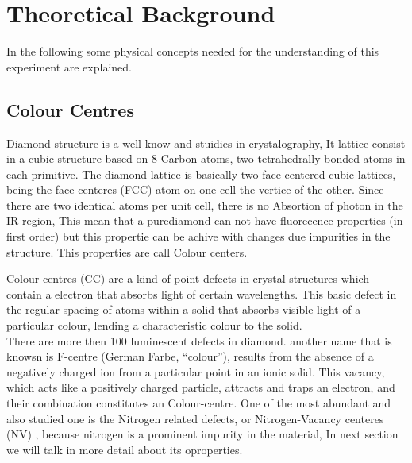 \section{Theoretical Background}
In the following some physical concepts needed for the understanding of this experiment are explained.
\subsection{Colour Centres}




Diamond structure is a well know and stuidies in crystalography, It lattice consist in a cubic structure based on 8 Carbon atoms, two tetrahedrally bonded atoms in each primitive. The diamond lattice is basically two face-centered cubic lattices, being the face centeres (FCC) atom on one cell the vertice of the other. Since there are two  identical atoms per unit cell, there is no Absortion of photon in the IR-region, This mean that a purediamond can not have fluorecence properties (in first order) but this propertie can be achive with changes due impurities in the structure. This properties are call Colour centers.

Colour centres (CC) are a kind of point defects in crystal structures which contain a electron that absorbs light of certain wavelengths. This basic defect in the regular spacing of atoms within a solid that absorbs visible light of a particular colour, lending a characteristic colour to the solid. \\

There are more then 100 luminescent defects in diamond. another name that is knowsn is F-centre (German Farbe, “colour”), results from the absence of a negatively charged ion from a particular point in an ionic solid. This vacancy, which acts like a positively charged particle, attracts and traps an electron, and their combination constitutes an Colour-centre.  One of the most abundant and also  studied one is the  Nitrogen related defects, or Nitrogen-Vacancy centeres (NV) , because  nitrogen is a prominent impurity in the material, In next section we will talk in more detail about its oproperties.



